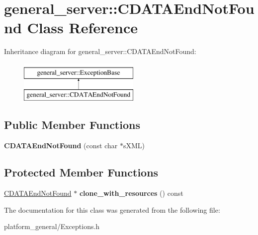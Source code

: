 \hypertarget{classgeneral__server_1_1CDATAEndNotFound}{\section{general\-\_\-server\-:\-:\-C\-D\-A\-T\-A\-End\-Not\-Found \-Class \-Reference}
\label{classgeneral__server_1_1CDATAEndNotFound}
}
\-Inheritance diagram for general\-\_\-server\-:\-:\-C\-D\-A\-T\-A\-End\-Not\-Found\-:\begin{figure}[H]
\begin{center}
\leavevmode
\includegraphics[height=2.000000cm]{classgeneral__server_1_1CDATAEndNotFound}
\end{center}
\end{figure}
\subsection*{\-Public \-Member \-Functions}
\begin{DoxyCompactItemize}
\item 
\hypertarget{classgeneral__server_1_1CDATAEndNotFound_a54e0a4fc0129eda890e1f1b2b1ab9cb3}{{\bfseries \-C\-D\-A\-T\-A\-End\-Not\-Found} (const char $\ast$s\-X\-M\-L)}\label{classgeneral__server_1_1CDATAEndNotFound_a54e0a4fc0129eda890e1f1b2b1ab9cb3}

\end{DoxyCompactItemize}
\subsection*{\-Protected \-Member \-Functions}
\begin{DoxyCompactItemize}
\item 
\hypertarget{classgeneral__server_1_1CDATAEndNotFound_ad8e4027982907d3a5a9fd8ddd93603b4}{\hyperlink{classgeneral__server_1_1CDATAEndNotFound}{\-C\-D\-A\-T\-A\-End\-Not\-Found} $\ast$ {\bfseries clone\-\_\-with\-\_\-resources} () const }\label{classgeneral__server_1_1CDATAEndNotFound_ad8e4027982907d3a5a9fd8ddd93603b4}

\end{DoxyCompactItemize}


\-The documentation for this class was generated from the following file\-:\begin{DoxyCompactItemize}
\item 
platform\-\_\-general/\-Exceptions.\-h\end{DoxyCompactItemize}
